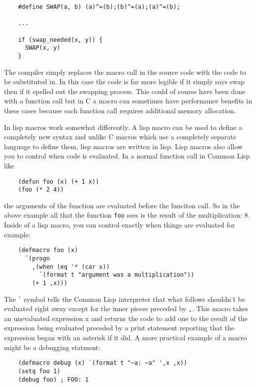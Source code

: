 \documentclass[11pt]{article}
\begin{document}
\begin{verbatim}
    #define SWAP(a, b) (a)^=(b);(b)^=(a);(a)^=(b);
    
    ...
    
    if (swap_needed(x, y)) {
      SWAP(x, y)
    }
\end{verbatim}

   
   The compiler simply replaces the macro call in the source code with
   the code to be substituted in.  In this case the code is far more
   legible if it simply says swap then if it spelled out the swapping
   process.  This could of course have been done with a function call
   but in C a macro can sometimes have performance benefits in these
   cases because each function call requires additional memory
   allocation.
   
   In lisp macros work somewhat differently.  A lisp macro can be used
   to define a completely new syntax and unlike C macros which use a
   completely separate language to define them, lisp macros are
   written in lisp.  Lisp macros also allow you to control when code
   is evaluated.  In a normal function call in Common Lisp like
   
\begin{verbatim}
    (defun foo (x) (+ 1 x))
    (foo (* 2 4))
\end{verbatim}

   
   the arguments of the function are evaluated before the funciton
   call.  So in the above example all that the function \verb|foo|
   sees is the result of the multiplication: $8$.  Inside of a lisp
   macro, you can control exactly when things are evaluated for
   example:
   
\begin{verbatim}
    (defmacro foo (x)
      `(progn
        ,(when (eq '* (car x))
          `(format t "argument was a multiplication"))
        (+ 1 ,x)))
\end{verbatim}

   
   The \verb|`| symbol tells the Common Lisp interpreter that what follows
   shouldn't be evaluated right away except for the inner pieces
   preceded by \verb|,|.  This macro takes an unevaluated expression x
   and returns the code to add one to the result of the expression being
   evaluated preceded by a print statement reporting that the
   expression began with an asterisk if it did.  A more practical
   example of a macro might be a debugging statment:
   
\begin{verbatim}
    (defmacro debug (x) `(format t "~a: ~a" ',x ,x))
    (setq foo 1)
    (debug foo) ; FOO: 1
\end{verbatim}
\end{document}
